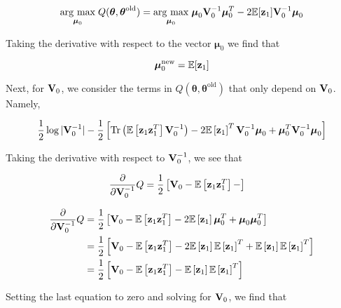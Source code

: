 \documentclass[11pt]{article}
\newcommand{\argmax}[1]{\underset{#1}{\operatorname{arg}\,\operatorname{max}}\;}
\newcommand{\expectation}[1]{\mathbb{E}\left[#1\right]}
\begin{document}
\begin{align}
	\argmax{\boldsymbol{\mu}_0} Q(\boldsymbol\theta, \boldsymbol\theta^\text{old}) = \argmax{\boldsymbol{\mu}_0} \boldsymbol{\mu}_0 {\bf V}_0^{-1}\boldsymbol{\mu}_0^T -2\mathbb{E}[{{\bf z}_1}]{\bf V}_0^{-1}\boldsymbol{\mu}_0 \nonumber
\end{align}

Taking the derivative with respect to the vector $\boldsymbol{\mu}_0$ we find that

\begin{equation}
	\boldsymbol{\mu}_0^\text{new} = \mathbb{E}[{{\bf z}_1}]
\end{equation}

Next, for ${\bf V}_0$, we consider the terms in $Q(\boldsymbol\theta, \boldsymbol\theta^\text{old})$ that only depend on ${\bf V}_0$. Namely,

\begin{equation}
	\frac{1}{2}\log \vert
	  {\bf V}_0^{-1}\vert -\frac{1}{2}\left[\text{Tr}\left(\mathbb{E}\left[{\bf z}_1 {\bf z}_1^T\right] {\bf V}_0^{-1}\right) -2 \mathbb{E}\left[{\bf z}_1\right]^T{\bf V}_0^{-1}\boldsymbol\mu_0 + \boldsymbol\mu_0^T {\bf V}_0^{-1}\boldsymbol\mu_0\right] \nonumber
\end{equation}

Taking the derivative with respect to ${\bf V}_0^{-1}$, we see that

\begin{align}
	\frac{\partial}{\partial {\bf V}_0^{-1}}Q &= \frac{1}{2}\left[ {\bf V}_0 -  \mathbb{E}\left[{\bf z}_1 {\bf z}_1^T\right] - \right]
\end{align}

\begin{align}
	\frac{\partial}{\partial {\bf V}_0^{-1}} Q &= \frac{1}{2}\left[{\bf V}_0 - \expectation{{\bf z}_1 {\bf z}_1^T} - 2\expectation{{\bf z}_1}\boldsymbol{\mu}_0^T + \boldsymbol{\mu}_0 \boldsymbol{\mu}_0^T \right] \nonumber \\
	&= \frac{1}{2} \left[{\bf V}_0 - \expectation{{\bf z}_1 {\bf z}_1^T} - 2\expectation{{\bf z}_1}\expectation{{\bf z}_1}^T + \expectation{{\bf z}_1}\expectation{{\bf z}_1}^T \right] \nonumber \\
	&= \frac{1}{2}\left[{\bf V}_0 - \expectation{{\bf z}_1 {\bf z}_1^T} - \expectation{{\bf z}_1}\expectation{{\bf z}_1}^T\right]
\end{align}

Setting the last equation to zero and solving for ${\bf V}_0$, we find that
\end{document}
